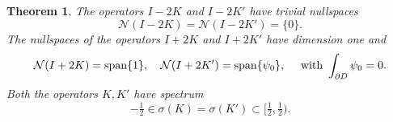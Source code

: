 \documentclass[10pt, a4paper, twoside, openright]{book}
\theoremstyle{definition}
\theoremstyle{plain}
\newtheorem{theorem}[subsection]{Theorem}
\theoremstyle{plain}
\theoremstyle{plain}
\theoremstyle{plain}
\theoremstyle{plain}
\theoremstyle{plain}
\theoremstyle{plain}
\theoremstyle{plain}
\begin{document}
\begin{theorem}
\label{theo:K-nullspace}
 The operators $I-2K$ and $I-2K'$ have trivial nullspaces
 \begin{equation}
  \mathcal{N}(I-2K)=\mathcal{N}(I-2K')=\{0\}.
 \end{equation}
 The nullspaces of the operators $I+2K$ and $I+2K'$ have dimension one and
 \begin{equation}
  \mathcal{N}(I+2K)=\textup{span}\{1\}, \quad \mathcal{N}(I+2K')=\textup{span}\{\psi_0\}, \quad\textup{ with }\int_{\partial D}\psi_0=0.
 \end{equation}
 Both the operators $K,K'$ have spectrum
 \begin{equation}
 \label{eq:K-spectrum}
  -\tfrac{1}{2}\in\sigma(K)=\sigma(K')\subset \bigl[\tfrac{1}{2}, \tfrac{1}{2}\bigr).
 \end{equation}
\end{theorem}
\end{document}
